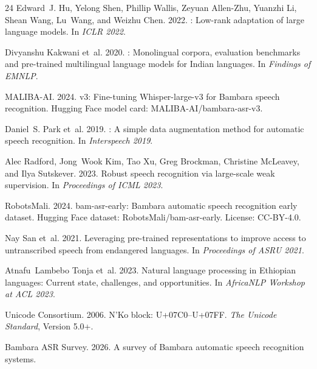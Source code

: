 \documentclass[11pt]{article}
\begin{document}
\begin{thebibliography}{24}
Edward~J. Hu, Yelong Shen, Phillip Wallis, Zeyuan Allen-Zhu, Yuanzhi Li, Shean Wang, Lu~Wang, and Weizhu Chen. 2022.
: Low-rank adaptation of large language models.
\newblock In \emph{ICLR 2022}.

Divyanshu Kakwani et~al. 2020.
: Monolingual corpora, evaluation benchmarks and pre-trained multilingual language models for {Indian} languages.
\newblock In \emph{Findings of EMNLP}.

{MALIBA-AI}. 2024.
 v3: Fine-tuning {Whisper}-large-v3 for {Bambara} speech recognition.
\newblock Hugging Face model card: MALIBA-AI/bambara-asr-v3.

Daniel~S. Park et~al. 2019.
: A simple data augmentation method for automatic speech recognition.
\newblock In \emph{Interspeech 2019}.

Alec Radford, Jong~Wook Kim, Tao Xu, Greg Brockman, Christine McLeavey, and Ilya Sutskever. 2023.
\newblock Robust speech recognition via large-scale weak supervision.
\newblock In \emph{Proceedings of ICML 2023}.

{RobotsMali}. 2024.
\newblock bam-asr-early: {Bambara} automatic speech recognition early dataset.
\newblock Hugging Face dataset: RobotsMali/bam-asr-early. License: CC-BY-4.0.

Nay San et~al. 2021.
\newblock Leveraging pre-trained representations to improve access to untranscribed speech from endangered languages.
\newblock In \emph{Proceedings of ASRU 2021}.

Atnafu~Lambebo Tonja et~al. 2023.
\newblock Natural language processing in {Ethiopian} languages: Current state, challenges, and opportunities.
\newblock In \emph{AfricaNLP Workshop at ACL 2023}.

{Unicode Consortium}. 2006.
\newblock N'Ko block: {U+07C0--U+07FF}.
\newblock \emph{The Unicode Standard}, Version 5.0+.

{Bambara ASR Survey}. 2026.
\newblock A survey of {Bambara} automatic speech recognition systems.


\end{thebibliography}
\end{document}
